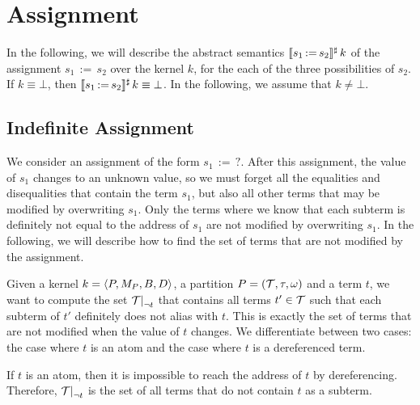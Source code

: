\section{Assignment}

In the following, we will describe the abstract semantics $\llbracket s_1\,{:=}\,s_2\rrbracket^\sharp\,k$ of the assignment $s_1\,{:=}\,s_2$ over the kernel $k$, for the each of the three possibilities of $s_2$.
If $k \equiv \bot$, then $\llbracket s_1\,{:=}\,s_2\rrbracket^\sharp\,k \equiv \bot$.
In the following, we assume that $k \neq \bot$.

\subsection{Indefinite Assignment}

We consider an assignment of the form $s_1\,{:=}\,?$.
After this assignment, the value of $s_1$ changes to an unknown value,
so we must forget all the equalities and disequalities that contain the term $s_1$,
but also all other terms that may be modified by overwriting $s_1$.
Only the terms where we know that each subterm is definitely not equal to the address of $s_1$ are not modified by overwriting $s_1$.
In the following, we will describe how to find the set of terms
that are not modified by the assignment.


Given a kernel $k = \langle P, M_P, B, D\rangle$, a partition $P = (\mathcal{T}, \tau, \omega)$ and a term $t$,
we want to compute the set $\restr{\T}{\neg t}$ that contains all terms $t' \in \mathcal{T}$ such that each subterm of $t'$ definitely does not alias with $t$.
This is exactly the set of terms that are not modified when the value of $t$ changes.
We differentiate between two cases: the case where $t$ is an atom and the case where $t$ is a dereferenced term.

If $t$ is an atom, then it is impossible to reach the address of $t$ by dereferencing.
Therefore, $\restr{\T}{\neg t}$ is the set of all terms that do not contain $t$ as a subterm.

